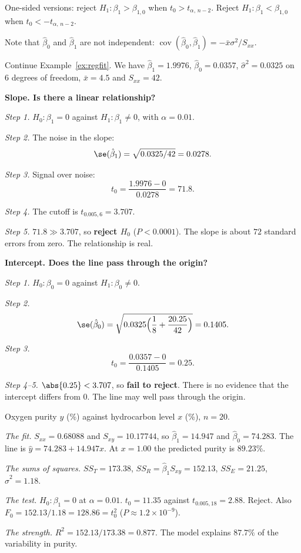 One-sided versions: reject $H_1:\beta_1>\beta_{1,0}$ when $t_0>t_{\alpha,\,n-2}$. Reject $H_1:\beta_1<\beta_{1,0}$ when $t_0<-t_{\alpha,\,n-2}$.

Note that $\hat\beta_0$ and $\hat\beta_1$ are not independent: $\operatorname{cov}(\hat\beta_0,\hat\beta_1)=-\bar{x}\sigma^2/S_{xx}$.

\begin{example}
Continue Example~\ref{ex:regfit}. We have $\hat\beta_1=1.9976$, $\hat\beta_0=0.0357$, $\hat\sigma^2=0.0325$ on $6$ degrees of freedom, $\bar{x}=4.5$ and $S_{xx}=42$.

\textbf{Slope. Is there a linear relationship?}

\emph{Step 1.} $H_0:\beta_1=0$ against $H_1:\beta_1\ne0$, with $\alpha=0.01$.

\emph{Step 2.} The noise in the slope:
\[ \se(\hat\beta_1)=\sqrt{0.0325/42}=0.0278. \]

\emph{Step 3.} Signal over noise:
\[ t_0=\frac{1.9976-0}{0.0278}=71.8. \]

\emph{Step 4.} The cutoff is $t_{0.005,6}=3.707$.

\emph{Step 5.} $71.8\gg3.707$, so \textbf{reject $H_0$} ($P<0.0001$). The slope is about $72$ standard errors from zero. The relationship is real.

\textbf{Intercept. Does the line pass through the origin?}

\emph{Step 1.} $H_0:\beta_0=0$ against $H_1:\beta_0\ne0$.

\emph{Step 2.}
\[ \se(\hat\beta_0)=\sqrt{0.0325\Big(\frac18+\frac{20.25}{42}\Big)}=0.1405. \]

\emph{Step 3.}
\[ t_0=\frac{0.0357-0}{0.1405}=0.25. \]

\emph{Step 4--5.} $\abs{0.25}<3.707$, so \textbf{fail to reject}. There is no evidence that the intercept differs from $0$. The line may well pass through the origin.
\end{example}

\begin{example}
Oxygen purity $y$ (\%) against hydrocarbon level $x$ (\%), $n=20$.

\emph{The fit.} $S_{xx}=0.68088$ and $S_{xy}=10.17744$, so $\hat\beta_1=14.947$ and $\hat\beta_0=74.283$. The line is $\hat{y}=74.283+14.947x$. At $x=1.00$ the predicted purity is $89.23\%$.

\emph{The sums of squares.} $SS_T=173.38$, $SS_R=\hat\beta_1S_{xy}=152.13$, $SS_E=21.25$, $\hat\sigma^2=1.18$.

\emph{The test.} $H_0:\beta_1=0$ at $\alpha=0.01$. $t_0=11.35$ against $t_{0.005,18}=2.88$. Reject. Also $F_0=152.13/1.18=128.86=t_0^2$ ($P\approx1.2\times10^{-9}$).

\emph{The strength.} $R^2=152.13/173.38=0.877$. The model explains $87.7\%$ of the variability in purity.
\end{example}

